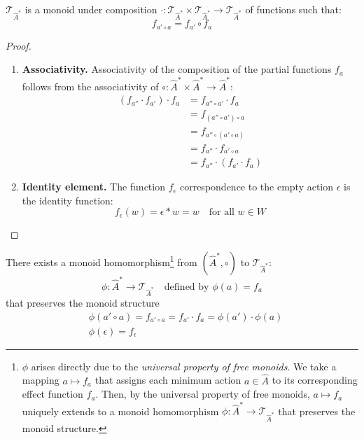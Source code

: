 \begin{proposition}\label{prp:T_is_monoid}
	$\mathcal{T}_{\hat{A}^{\ast}}$ is a monoid under composition $\cdot: \mathcal{T}_{\hat{A}^{\ast}} \times \mathcal{T}_{\hat{A}^{\ast}} \to \mathcal{T}_{\hat{A}^{\ast}}$ of functions such that:
	\begin{equation}
		f_{a' \circ a} = f_{a'} \circ f_{a}
	\end{equation}
\end{proposition}
\begin{proof}
	\begin{enumerate}[(1)]
		\item \textbf{Associativity.}
		      Associativity of the composition of the partial functions $f_{a}$ follows from the associativity of $\circ: \hat{A}^{\ast} \times \hat{A}^{\ast} \to \hat{A}^{\ast}$:
		      \begin{align}
			      (f_{a''} \cdot f_{a'}) \cdot f_{a} & = f_{a'' \circ a'} \cdot f_{a}       \\
			                                         & = f_{(a'' \circ a') \circ a}         \\
			                                         & = f_{a'' \circ (a' \circ a)}         \\
			                                         & = f_{a''} \cdot f_{a' \circ a}       \\
			                                         & = f_{a''} \cdot (f_{a'} \cdot f_{a})
		      \end{align}
		\item \textbf{Identity element.}
		      The function $f_{\epsilon}$ correspondence to the empty action $\epsilon$ is the identity function:
		      \begin{equation}
			      f_{\epsilon}(w) = \epsilon \ast w = w \quad \text{for all $w \in W$}
		      \end{equation}
	\end{enumerate}
\end{proof}

There exists a monoid homomorphism\footnote{
$\phi$ arises directly due to the \emph{universal property of free monoids}.
We take a mapping $a \mapsto f_{a}$ that assigns each minimum action $a \in \hat{A}$ to its corresponding effect function $f_{a}$.
Then, by the universal property of free monoids, $a \mapsto f_{a}$ uniquely extends to a monoid homomorphism $\phi : \hat{A}^{\ast} \to \mathcal{T}_{\hat{A}^{\ast}}$ that preserves the monoid structure.
} from $(\hat{A}^{\ast}, \circ)$ to $\mathcal{T}_{\hat{A}^{\ast}}$:
\begin{equation}
	\phi : \hat{A}^{\ast} \to \mathcal{T}_{\hat{A}^{\ast}} \quad\text{defined by $\phi(a) = f_{a}$}
\end{equation}
that preserves the monoid structure
\begin{align}
	 & \phi(a' \circ a) = f_{a' \circ a} = f_{a'} \cdot f_{a} = \phi(a') \cdot \phi(a) \\
	 & \phi(\epsilon) = f_{\epsilon}
\end{align}


